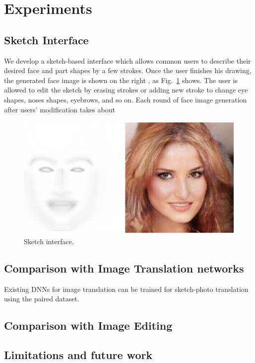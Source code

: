 \section{Experiments}
\label{sec:experiments}




\subsection{Sketch Interface}
We develop a sketch-based interface which allows common users to describe their desired face and part shapes by a few strokes. Once the user finishes his drawing, the generated face image is shown on the right , as Fig.~\ref{fig:interface} shows.
The user is allowed to edit the sketch by erasing strokes or adding new stroke to change eye shapes, noses shapes, eyebrows, and so on.
%
Each round of face image generation after users' modification takes about 
%




\begin{figure}
	\centering
	\includegraphics[width=\columnwidth]{figs/interface.png}
	\caption{Sketch interface. }
	\label{fig:interface}
\end{figure}
 


\subsection{Comparison with Image Translation networks}

Existing DNNs for image translation can be trained for sketch-photo translation using the paired dataset.

\subsection{Comparison with Image Editing}


\subsection{Limitations and future work}


